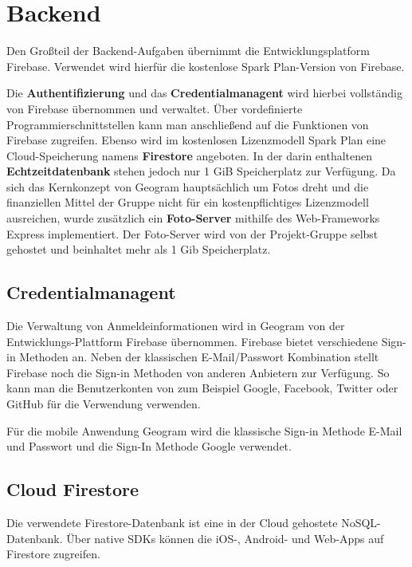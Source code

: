 \section{Backend\label{sec3.2:Unterpunkt-2}}

Den Großteil der Backend-Aufgaben übernimmt die Entwicklungsplatform Firebase. Verwendet wird hierfür die kostenlose \glqq Spark Plan\grqq{}-Version von Firebase. 

Die \textbf{Authentifizierung} und das \textbf{Credentialmanagent} wird hierbei vollständig von Firebase übernommen und verwaltet. Über vordefinierte Programmierschnittstellen kann man anschließend auf die Funktionen von Firebase zugreifen. Ebenso wird im kostenlosen Lizenzmodell \glqq Spark Plan\grqq{} eine Cloud-Speicherung namens \glqq \textbf{Firestore}\grqq{} angeboten. In der darin enthaltenen \textbf{Echtzeitdatenbank} stehen jedoch nur 1 GiB Speicherplatz zur Verfügung. Da sich das Kernkonzept von Geogram hauptsächlich um Fotos dreht und die finanziellen Mittel der Gruppe nicht für ein kostenpflichtiges Lizenzmodell ausreichen, wurde zusätzlich ein \textbf{Foto-Server} mithilfe des Web-Frameworks \glqq Express\grqq{} implementiert. Der Foto-Server wird von der Projekt-Gruppe selbst gehostet und beinhaltet mehr als 1 Gib Speicherplatz.

\subsection{Credentialmanagent\label{sup3.2.1:Unterpunkt-1}}

Die Verwaltung von Anmeldeinformationen wird in Geogram von der Entwicklungs-Plattform Firebase übernommen. Firebase bietet verschiedene Sign-in Methoden an. Neben der klassischen E-Mail/Passwort Kombination stellt Firebase noch die Sign-in Methoden von anderen Anbietern zur Verfügung. So kann man die Benutzerkonten von zum Beispiel Google, Facebook, Twitter oder GitHub für die Verwendung verwenden.

Für die mobile Anwendung Geogram wird die klassische Sign-in Methode \glqq E-Mail und Passwort\grqq{} und die Sign-In Methode \glqq Google\grqq{} verwendet.

\subsection{Cloud Firestore\label{sup3.2.2:Unterpunkt-2}}

Die verwendete Firestore-Datenbank ist eine in der Cloud gehostete NoSQL-Datenbank. Über native SDKs können die iOS-, Android- und Web-Apps auf Firestore zugreifen.

